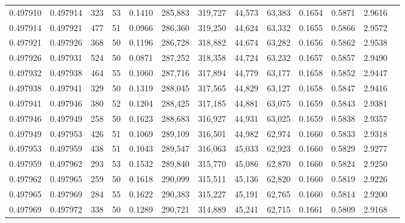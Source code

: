 \begin{tabular}{rrrrrrrrrrrrr}
0.497910 & 0.497914 & 323 &  53 &                                     0.1410 & 285,883 & 319,727 &  44,573 &  63,383 & 0.1654 & 0.5871 & 2.9616 \\
0.497914 & 0.497921 & 477 &  51 &                                     0.0966 & 286,360 & 319,250 &  44,624 &  63,332 & 0.1655 & 0.5866 & 2.9572 \\
0.497921 & 0.497926 & 368 &  50 &                                     0.1196 & 286,728 & 318,882 &  44,674 &  63,282 & 0.1656 & 0.5862 & 2.9538 \\
0.497926 & 0.497931 & 524 &  50 &                                     0.0871 & 287,252 & 318,358 &  44,724 &  63,232 & 0.1657 & 0.5857 & 2.9490 \\
0.497932 & 0.497938 & 464 &  55 &                                     0.1060 & 287,716 & 317,894 &  44,779 &  63,177 & 0.1658 & 0.5852 & 2.9447 \\
0.497938 & 0.497941 & 329 &  50 &                                     0.1319 & 288,045 & 317,565 &  44,829 &  63,127 & 0.1658 & 0.5847 & 2.9416 \\
0.497941 & 0.497946 & 380 &  52 &                                     0.1204 & 288,425 & 317,185 &  44,881 &  63,075 & 0.1659 & 0.5843 & 2.9381 \\
0.497946 & 0.497949 & 258 &  50 &                                     0.1623 & 288,683 & 316,927 &  44,931 &  63,025 & 0.1659 & 0.5838 & 2.9357 \\
0.497949 & 0.497953 & 426 &  51 &                                     0.1069 & 289,109 & 316,501 &  44,982 &  62,974 & 0.1660 & 0.5833 & 2.9318 \\
0.497953 & 0.497959 & 438 &  51 &                                     0.1043 & 289,547 & 316,063 &  45,033 &  62,923 & 0.1660 & 0.5829 & 2.9277 \\
0.497959 & 0.497962 & 293 &  53 &                                     0.1532 & 289,840 & 315,770 &  45,086 &  62,870 & 0.1660 & 0.5824 & 2.9250 \\
0.497962 & 0.497965 & 259 &  50 &                                     0.1618 & 290,099 & 315,511 &  45,136 &  62,820 & 0.1660 & 0.5819 & 2.9226 \\
0.497965 & 0.497969 & 284 &  55 &                                     0.1622 & 290,383 & 315,227 &  45,191 &  62,765 & 0.1660 & 0.5814 & 2.9200 \\
0.497969 & 0.497972 & 338 &  50 &                                     0.1289 & 290,721 & 314,889 &  45,241 &  62,715 & 0.1661 & 0.5809 & 2.9168 \\

\end{tabular}
